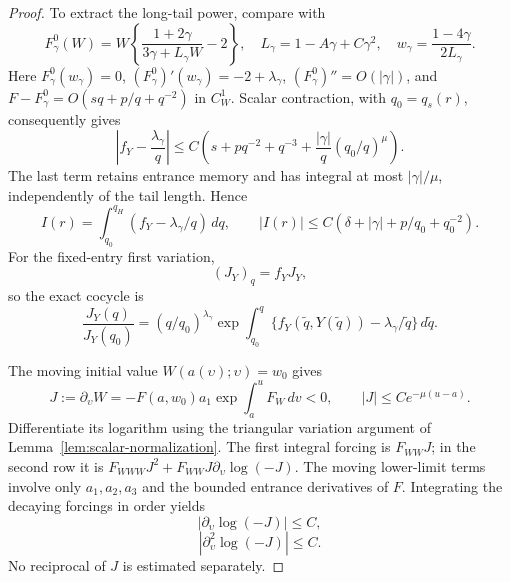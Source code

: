 \begin{proof}
To extract the long-tail power, compare with
\[
 F^0_\gamma(W)=W\left\{\frac{1+2\gamma}{3\gamma+L_\gamma W}-2\right\},
 \quad L_\gamma=1-A\gamma+C\gamma^2,
 \quad w_\gamma=\frac{1-4\gamma}{2L_\gamma}.
\]
Here \(F^0_\gamma(w_\gamma)=0\),
\((F^0_\gamma)'(w_\gamma)=-2+\lambda_\gamma\),
\((F^0_\gamma)''=O(|\gamma|)\), and
\(F-F^0_\gamma=O(sq+p/q+q^{-2})\) in \(C^1_W\).
Scalar contraction, with \(q_0=q_s(r)\), consequently gives
\begin{equation}\label{ann:repair-memory-remainder}
 \left|f_Y-\frac{\lambda_\gamma}{q}\right|
 \le C\left(s+pq^{-2}+q^{-3}
       +\frac{|\gamma|}{q}(q_0/q)^\mu\right).
\end{equation}
The last term retains entrance memory and has integral at most
\(|\gamma|/\mu\), independently of the tail length. Hence
\begin{equation}\label{ann:repair-integrated-remainder}
 I(r)=\int_{q_0}^{q_H}(f_Y-\lambda_\gamma/q)\,dq,\qquad
 |I(r)|\le C(\delta+|\gamma|+p/q_0+q_0^{-2}).
\end{equation}
For the fixed-entry first variation,
\begin{equation}\label{ann:negative-first-variation}
 (J_Y)_q=f_YJ_Y,
\end{equation}
so the exact cocycle is
\begin{equation}\label{ann:negative-free-factor}
 \frac{J_Y(q)}{J_Y(q_0)}=(q/q_0)^{\lambda_\gamma}
 \exp\int_{q_0}^{q}\{f_Y(\widetilde q,Y(\widetilde q))-\lambda_\gamma/\widetilde q\}\,d\widetilde q.
\end{equation}

The moving initial value \(W(a(\upsilon);\upsilon)=w_0\) gives
\begin{equation}\label{ann:repair-moving-variation}
 J:=\partial_\upsilon W=-F(a,w_0)a_1
 \exp\int_a^uF_W\,dv<0,\qquad |J|\le Ce^{-\mu(u-a)}.
\end{equation}
Differentiate its logarithm using the triangular variation argument of
Lemma~\ref{lem:scalar-normalization}. The first integral forcing is
\(F_{WW}J\); in the second row it is
\(F_{WWW}J^2+F_{WW}J\partial_\upsilon\log(-J)\).
The moving lower-limit terms involve only \(a_1,a_2,a_3\) and the
bounded entrance derivatives of \(F\). Integrating the decaying
forcings in order yields
\begin{equation}\label{ann:repair-moving-log-first}
 |\partial_\upsilon\log(-J)|\le C,
\end{equation}
\begin{equation}\label{ann:repair-moving-log-second}
 |\partial_\upsilon^2\log(-J)|\le C.
\end{equation}
No reciprocal of \(J\) is estimated separately.


\end{proof}
